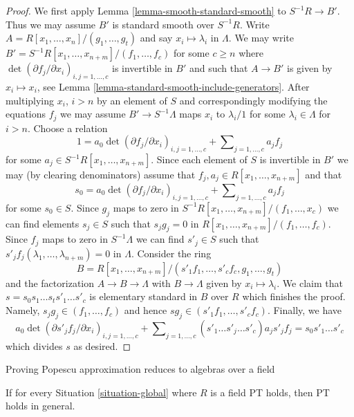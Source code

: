 \begin{proof}
We first apply Lemma \ref{lemma-smooth-standard-smooth} to $S^{-1}R \to B'$.
Thus we may assume $B'$ is standard smooth over $S^{-1}R$.
Write $A = R[x_1, \ldots, x_n]/(g_1, \ldots, g_t)$ and say
$x_i \mapsto \lambda_i$ in $\Lambda$. We may write
$B' = S^{-1}R[x_1, \ldots, x_{n + m}]/(f_1, \ldots, f_c)$
for some $c \geq n$ where
$\det(\partial f_j/\partial x_i)_{i, j = 1, \ldots, c}$
is invertible in $B'$ and such that $A \to B'$ is given by $x_i \mapsto x_i$,
see Lemma \ref{lemma-standard-smooth-include-generators}.
After multiplying $x_i$, $i > n$ by an element of $S$ and correspondingly
modifying the equations $f_j$ we may assume $B' \to S^{-1}\Lambda$ maps
$x_i$ to $\lambda_i/1$ for some $\lambda_i \in \Lambda$ for $i > n$.
Choose a relation
$$
1 =
a_0 \det(\partial f_j/\partial x_i)_{i, j = 1, \ldots, c}
+
\sum\nolimits_{j = 1, \ldots, c} a_jf_j
$$
for some $a_j \in S^{-1}R[x_1, \ldots, x_{n + m}]$. Since each element of $S$
is invertible in $B'$ we may (by clearing denominators) assume that
$f_j, a_j \in R[x_1, \ldots, x_{n + m}]$ and that
$$
s_0 = a_0 \det(\partial f_j/\partial x_i)_{i, j = 1, \ldots, c}
+
\sum\nolimits_{j = 1, \ldots, c} a_jf_j
$$
for some $s_0 \in S$. Since $g_j$ maps to zero in
$S^{-1}R[x_1, \ldots, x_{n + m}]/(f_1, \ldots, x_c)$
we can find elements $s_j \in S$ such that $s_j g_j = 0$ in
$R[x_1, \ldots, x_{n + m}]/(f_1, \ldots, f_c)$.
Since $f_j$ maps to zero in $S^{-1}\Lambda$ we can find $s'_j \in S$
such that $s'_j f_j(\lambda_1, \ldots, \lambda_{n + m}) = 0$ in
$\Lambda$. Consider the ring
$$
B = R[x_1, \ldots, x_{n + m}]/
(s'_1f_1, \ldots, s'_cf_c, g_1, \ldots, g_t)
$$
and the factorization $A \to B \to \Lambda$ with $B \to \Lambda$ given by
$x_i \mapsto \lambda_i$. We claim that $s = s_0s_1 \ldots s_ts'_1 \ldots s'_c$
is elementary standard in $B$ over $R$ which finishes the proof.
Namely, $s_j g_j \in (f_1, \ldots, f_c)$ and hence
$sg_j \in (s'_1f_1, \ldots, s'_cf_c)$. Finally, we have
$$
a_0\det(\partial s'_jf_j/\partial x_i)_{i, j = 1, \ldots, c}
+
\sum\nolimits_{j = 1, \ldots, c}
(s'_1 \ldots \hat{s'_j} \ldots s'_c) a_j s'_jf_j
=
s_0s'_1\ldots s'_c
$$
which divides $s$ as desired.
\end{proof}

\begin{lemma}
\label{lemma-reduce-to-field}
\begin{slogan}
Proving Popescu approximation reduces to algebras over a field
\end{slogan}
If for every Situation \ref{situation-global} where $R$
is a field PT holds, then PT holds in general.
\end{lemma}

